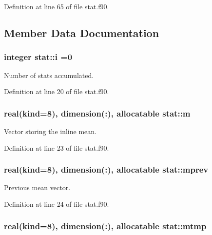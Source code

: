 Definition at line 65 of file stat.\-f90.



\subsection{Member Data Documentation}
\hypertarget{classstat_aae82ae81e5eb5620583fec6c93aa6fa3}{
\subsubsection[{i}]{\setlength{\rightskip}{0pt plus 5cm}integer stat\-::i =0\hspace{0.3cm}{\ttfamily [private]}}}\label{classstat_aae82ae81e5eb5620583fec6c93aa6fa3}


Number of stats accumulated. 



Definition at line 20 of file stat.\-f90.

\hypertarget{classstat_a2416f75ad24ac05a0ba615f9c8d467db}{
\subsubsection[{m}]{\setlength{\rightskip}{0pt plus 5cm}real(kind=8), dimension(\-:), allocatable stat\-::m\hspace{0.3cm}{\ttfamily [private]}}}\label{classstat_a2416f75ad24ac05a0ba615f9c8d467db}


Vector storing the inline mean. 



Definition at line 23 of file stat.\-f90.

\hypertarget{classstat_adcf5178f8d91cdc53ff5f28cc3e04689}{
\subsubsection[{mprev}]{\setlength{\rightskip}{0pt plus 5cm}real(kind=8), dimension(\-:), allocatable stat\-::mprev\hspace{0.3cm}{\ttfamily [private]}}}\label{classstat_adcf5178f8d91cdc53ff5f28cc3e04689}


Previous mean vector. 



Definition at line 24 of file stat.\-f90.

\hypertarget{classstat_a24c9afb1c1c6692185b509fd364508c8}{
\subsubsection[{mtmp}]{\setlength{\rightskip}{0pt plus 5cm}real(kind=8), dimension(\-:), allocatable stat\-::mtmp\hspace{0.3cm}{\ttfamily [private]}}}\label{classstat_a24c9afb1c1c6692185b509fd364508c8}


